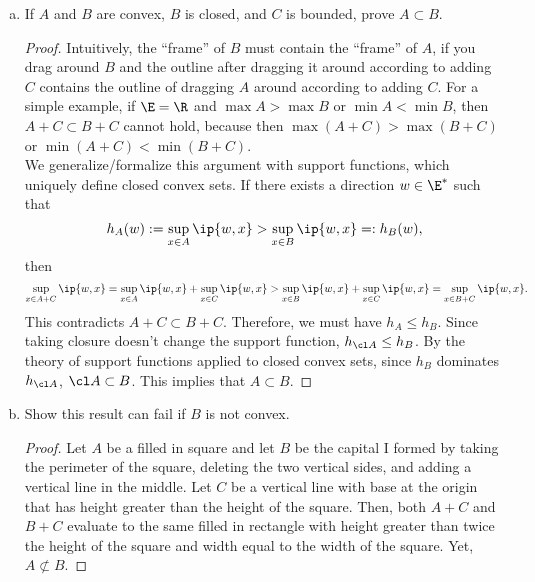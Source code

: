 \documentclass[12pt, letterpaper]{article}
\numberwithin{equation}{subsection}
\begin{document}
\begin{enumerate}[(a)]
\item If $A$ and $B$ are convex, $B$ is closed, and $C$ is bounded, 
prove $A\subset B$.
\begin{proof}
Intuitively, the ``frame'' of $B$ must contain the ``frame'' of $A$, if 
you drag around $B$ and the outline after dragging it around according 
to adding $C$ contains 
the outline of dragging $A$ around according to adding $C$. For a 
simple example, if $\E=\R$ and $\max A> \max B$ or $\min A< \min B$,
then $A+C\subset B+C$ cannot hold, because then 
$\max(A+C) > \max(B+C)$ or $\min(A+C) < \min(B+C)$. \\
We generalize/formalize this argument with support functions, which 
uniquely define closed convex sets. If there exists a direction 
$w\in\E^*$ such that 
\begin{equation*}
h_{A}(w) := \sup_{x\in A} \ip{w,x} > 
\sup_{x\in B} \ip{w,x} =: h_B(w),
\end{equation*}
then 
\begin{equation*}
\sup_{x\in A+C} \ip{w,x} = \sup_{x\in A} \ip{w,x} + \sup_{x\in C}\ip{w,x}
> \sup_{x\in B} \ip{w,x}+\sup_{x\in C}\ip{w,x} = \sup_{x\in B+C}\ip{w,x}.
\end{equation*}
This contradicts $A+C\subset B+C$. Therefore, we must have 
$h_A \leq h_B$. Since taking closure doesn't change the support function, 
$h_{\cl A}\leq h_B$. By the theory of support functions applied to 
closed convex sets, since $h_B$ dominates $h_{\cl A}$,
 $\cl A \subset B$. This implies that $A\subset B$.
\end{proof}
\item Show this result can fail if $B$ is not convex.
\begin{proof}
Let $A$ be a filled in square and let $B$ be the capital I formed by 
taking the perimeter of the square, deleting the two vertical sides, 
and adding a vertical line in the middle. Let $C$ be a vertical line 
with base at the origin that has height greater than the height of 
the square. Then, both $A+C$ and $B+C$ evaluate to the same filled in 
rectangle with height greater than twice the height of the square and 
width equal to the width of the square. Yet, $A\not\subset B$.
\end{proof}
\end{enumerate}
\end{document}

